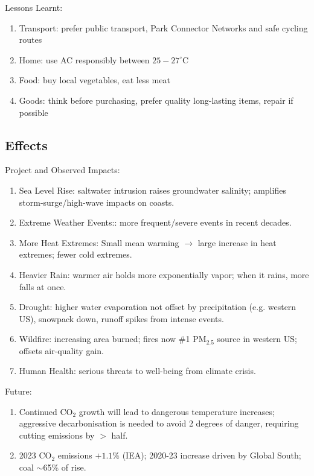 \documentclass[12pt, a4paper]{article}
\begin{document}
\begin{multicols*}{3}
Lessons Learnt:
\begin{enumerate}[\roman*.]
  \item Transport: prefer public transport, Park Connector Networks and safe cycling routes
  \item Home: use AC responsibly between $25-27^{\circ}$C
  \item Food: buy local vegetables, eat less meat
  \item Goods: think before purchasing, prefer quality long-lasting items, repair if possible
\end{enumerate}
\vspace{-1em}
\colbreak
\subsection{Effects}
Project and Observed Impacts:
\begin{enumerate}[\roman*.]
  \item Sea Level Rise: saltwater intrusion raises groundwater salinity; amplifies storm-surge/high-wave impacts on coasts.
  \item Extreme Weather Events:: more frequent/severe events in recent decades.
  \item More Heat Extremes: Small mean warming $\rightarrow$ large increase in heat extremes; fewer cold extremes.
  \item Heavier Rain: warmer air holds more exponentially vapor; when it rains, more falls at once.
  \item Drought: higher water evaporation not offset by precipitation (e.g. western US), snowpack down, runoff spikes from intense events.
  \item Wildfire: increasing area burned; fires now \#1 PM$_{2.5}$ source in western US; offsets air-quality gain.
  \item Human Health: serious threats to well-being from climate crisis.
\end{enumerate}

Future:
\begin{enumerate}[\roman*.]
  \item Continued CO$_2$ growth will lead to dangerous temperature increases; aggressive decarbonisation is needed to avoid 2 degrees of danger, requiring cutting emissions by $>$ half.
  \item 2023 CO$_2$ emissions $+1.1\%$ (IEA); 2020-23 increase driven by Global South; coal $\sim$65\% of rise.
\end{enumerate}

\end{multicols*}
\end{document}
